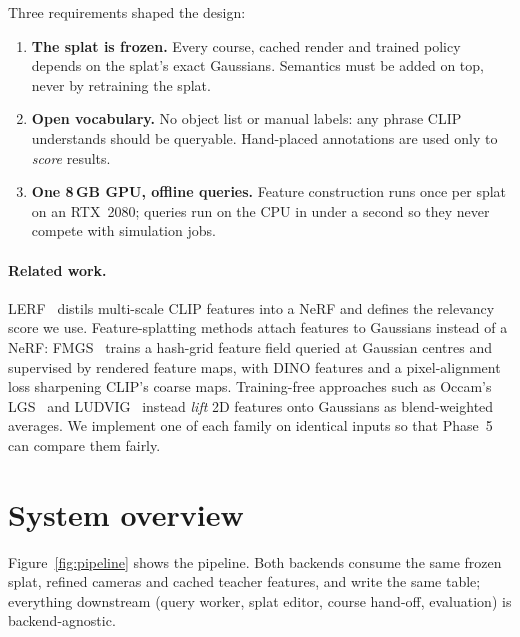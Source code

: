 \documentclass[11pt,a4paper]{article}
\begin{document}
Three requirements shaped the design:
\begin{enumerate}
  \item \textbf{The splat is frozen.} Every course, cached render and trained policy depends on the splat's
        exact Gaussians. Semantics must be added on top, never by retraining the splat.
  \item \textbf{Open vocabulary.} No object list or manual labels: any phrase CLIP understands should be
        queryable. Hand-placed annotations are used only to \emph{score} results.
  \item \textbf{One 8\,GB GPU, offline queries.} Feature construction runs once per splat on an RTX~2080;
        queries run on the CPU in under a second so they never compete with simulation jobs.
\end{enumerate}

\paragraph{Related work.} LERF~\cite{lerf} distils multi-scale CLIP features into a NeRF and defines the
relevancy score we use. Feature-splatting methods attach features to Gaussians instead of a NeRF:
FMGS~\cite{fmgs} trains a hash-grid feature field queried at Gaussian centres and supervised by rendered
feature maps, with DINO features and a pixel-alignment loss sharpening CLIP's coarse maps. Training-free
approaches such as Occam's LGS~\cite{occam} and LUDVIG~\cite{ludvig} instead \emph{lift} 2D features onto
Gaussians as blend-weighted averages. We implement one of each family on identical inputs so that Phase~5 can
compare them fairly.

\section{System overview}

Figure~\ref{fig:pipeline} shows the pipeline. Both backends consume the same frozen splat, refined cameras and
cached teacher features, and write the same table; everything downstream (query worker, splat editor, course
hand-off, evaluation) is backend-agnostic.
\end{document}
